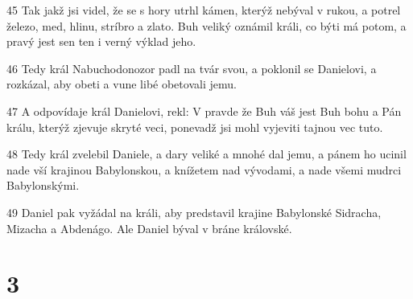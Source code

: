 \par 45 Tak jakž jsi videl, že se s hory utrhl kámen, kterýž nebýval v rukou, a potrel železo, med, hlinu, stríbro a zlato. Buh veliký oznámil králi, co býti má potom, a pravý jest sen ten i verný výklad jeho.
\par 46 Tedy král Nabuchodonozor padl na tvár svou, a poklonil se Danielovi, a rozkázal, aby obeti a vune libé obetovali jemu.
\par 47 A odpovídaje král Danielovi, rekl: V pravde že Buh váš jest Buh bohu a Pán králu, kterýž zjevuje skryté veci, ponevadž jsi mohl vyjeviti tajnou vec tuto.
\par 48 Tedy král zvelebil Daniele, a dary veliké a mnohé dal jemu, a pánem ho ucinil nade vší krajinou Babylonskou, a knížetem nad vývodami, a nade všemi mudrci Babylonskými.
\par 49 Daniel pak vyžádal na králi, aby predstavil krajine Babylonské Sidracha, Mizacha a Abdenágo. Ale Daniel býval v bráne královské.

\chapter{3}

